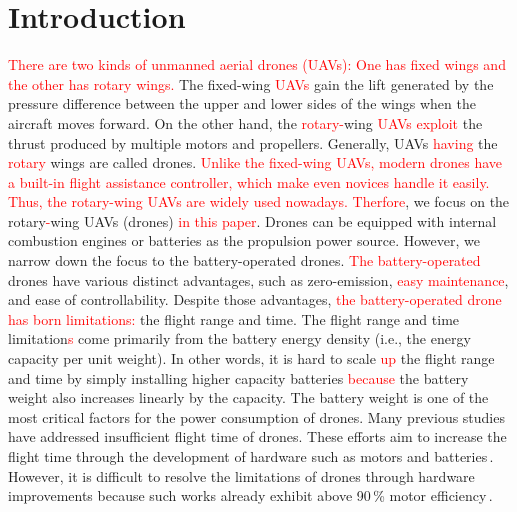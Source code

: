 \documentclass[journal]{./template/IEEEtran}
\begin{document}
\section{Introduction}
\label{Section: introduction}

\textcolor{red}{There are two kinds of unmanned aerial drones (UAVs): One has fixed wings and the other has rotary wings.}
The fixed-wing \textcolor{red}{UAVs} gain the lift generated by the pressure difference between the upper and lower sides of the wings when the aircraft moves forward. 
On the other hand, the \textcolor{red}{rotary-}wing \textcolor{red}{UAVs exploit} the thrust produced by multiple motors and propellers. 
Generally, UAVs \textcolor{red}{having} the \textcolor{red}{rotary} wings are called drones. 
\textcolor{red}{Unlike the fixed-wing UAVs, modern drones have a built-in flight assistance controller, which make even novices handle it easily. Thus, the rotary-wing UAVs are widely used nowadays.} 
\textcolor{red}{Therfore}, we focus on the rotary\textcolor{red}{-}wing UAVs (drones) \textcolor{red}{in this paper}. 
Drones can be equipped with internal combustion engines or batteries as the propulsion power source. However, we narrow down the focus to the battery-operated drones.
\textcolor{red}{The battery-operated} drones have various distinct advantages, such as zero-emission, \textcolor{red}{easy maintenance}, and ease of controllability.
Despite those advantages, \textcolor{red}{the battery-operated drone has born limitations:} the flight range and time.
The flight range and time limitation\textcolor{red}{s} come primarily from the battery energy density (i.e., the energy capacity per unit weight).
In other words, it is hard to scale \textcolor{red}{up} the flight range and time by simply installing higher capacity batteries \textcolor{red}{because} the battery weight also increases linearly by the capacity. 
The battery weight is one of the most critical factors for the power consumption of drones.
Many previous studies have addressed insufficient flight time of drones. 
These efforts aim to increase the flight time through the development of hardware such as motors and batteries\,\cite{ref_1}.
However, it is difficult to resolve the limitations of drones through hardware improvements because such works already exhibit above 90\,\% motor efficiency\,\cite{ref_2}.
\end{document}
